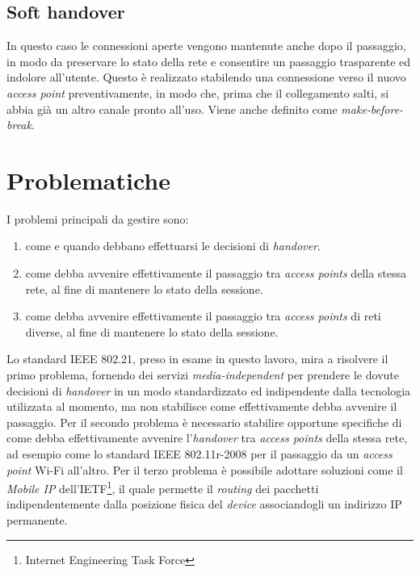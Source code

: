 \subsection{Soft handover}
In questo caso le connessioni aperte vengono mantenute anche dopo il passaggio, in modo da preservare lo stato della rete e consentire un passaggio trasparente ed indolore all'utente. Questo è realizzato stabilendo una connessione verso il nuovo {\em access point} preventivamente, in modo che, prima che il collegamento salti, si abbia già un altro canale pronto all'uso. Viene anche definito come {\em make-before-break}.

\section{Problematiche}
I problemi principali da gestire sono:
\begin{enumerate}
\item come e quando debbano effettuarsi le decisioni di {\em handover}.
\item come debba avvenire effettivamente il passaggio tra {\em access points} della stessa rete, al fine di mantenere lo stato della sessione.
\item come debba avvenire effettivamente il passaggio tra {\em access points} di reti diverse, al fine di mantenere lo stato della sessione.
\end{enumerate}
Lo standard IEEE 802.21, preso in esame in questo lavoro, mira a risolvere il primo problema, fornendo dei servizi {\em media-independent} per prendere le dovute decisioni di {\em handover} in un modo standardizzato ed indipendente dalla tecnologia utilizzata al momento, ma non stabilisce come effettivamente debba avvenire il passaggio.
Per il secondo problema è necessario stabilire opportune specifiche di come debba effettivamente avvenire l'{\em handover} tra {\em access points} della stessa rete, ad esempio come lo standard IEEE 802.11r-2008\cite{ieee80211r} per il passaggio da un {\em access point} Wi-Fi all'altro.
Per il terzo problema è possibile adottare soluzioni come il {\em Mobile IP}\cite{mobileip} dell'IETF\footnote{Internet Engineering Task Force}, il quale permette il {\em routing} dei pacchetti indipendentemente dalla posizione fisica del {\em device} associandogli un indirizzo IP permanente.